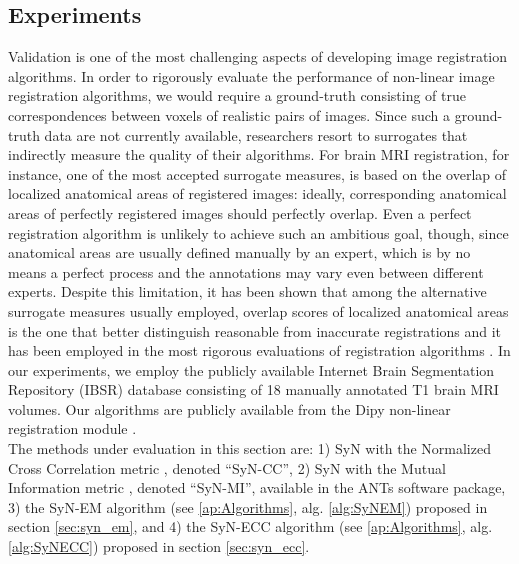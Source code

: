 \subsection{Experiments}
Validation is one of the most challenging aspects of developing image registration algorithms. In order to rigorously evaluate the performance of non-linear
image registration algorithms, we would require a ground-truth consisting of true correspondences between voxels of realistic pairs of images. Since such a ground-truth data are not currently available, researchers resort to surrogates that indirectly measure the quality of their algorithms. For brain MRI registration, for instance, one of the most accepted surrogate measures, is based on the overlap of localized anatomical areas of registered images: ideally, corresponding anatomical areas of perfectly registered images should perfectly overlap. Even a perfect registration algorithm is unlikely to achieve such an ambitious goal, though, since anatomical areas are usually defined manually by an expert, which is by no means a perfect process and the annotations may vary even between different experts. Despite this limitation, it has been shown that among the alternative surrogate measures usually employed, overlap scores of localized anatomical areas is the one that better distinguish reasonable from inaccurate registrations \citep{Rohlfing2012} and it has been employed in the most rigorous evaluations of registration algorithms \citep{Klein2009, Klein2010, Rohlfing2012}. In our experiments, we employ the publicly available Internet Brain Segmentation Repository (IBSR) database consisting of 18 manually annotated T1 brain MRI volumes. Our algorithms are publicly available from the Dipy non-linear registration module \citep{Garyfallidis2014}.\\ 

The methods under evaluation in this section are: 1) SyN with the Normalized Cross Correlation metric \citep{Avants2008, Avants2011}, denoted ``SyN-CC'', 2) SyN with the Mutual Information metric \citep{Mattes2003, Avants2011}, denoted ``SyN-MI'', available in the ANTs software package, 3) the SyN-EM algorithm (see \ref{ap:Algorithms}, alg. \ref{alg:SyNEM}) proposed in section \ref{sec:syn_em}, and 4) the SyN-ECC algorithm (see \ref{ap:Algorithms}, alg. \ref{alg:SyNECC}) proposed in section \ref{sec:syn_ecc}. 